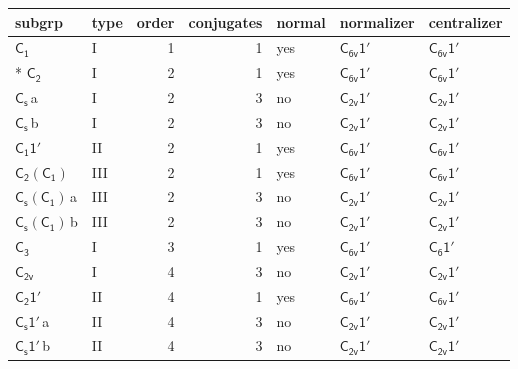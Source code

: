 \documentclass[10pt,a4paper]{article}
\numberwithin{equation}{section}
\newcommand{\grp}[1]{\mathsf{#1}}
\newcommand{\clsletter}[1]{\,{\scriptsize\color{black!55}#1}}
\begin{document}
{\small\begin{longtable}{@{}llrrlll@{}}\toprule
subgrp & type & order & conjugates & normal & normalizer & centralizer\\\midrule\endhead
\bottomrule\endfoot\endlastfoot
\href{../../../rotation/data/pdf/C1.pdf}{$\grp{C_{1}}$} & I & 1 & 1 & yes & \href{C6v-1p.pdf}{$\grp{C_{6v}1'}$} & \href{C6v-1p.pdf}{$\grp{C_{6v}1'}$}\\*
\href{../../../rotation/data/pdf/C2.pdf}{$\grp{C_{2}}$} & I & 2 & 1 & yes & \href{C6v-1p.pdf}{$\grp{C_{6v}1'}$} & \href{C6v-1p.pdf}{$\grp{C_{6v}1'}$}\\
\href{../../../rotation/data/pdf/C1v.pdf}{$\grp{C_{s}}$}\clsletter{a} & I & 2 & 3 & no & \href{C2v-1p.pdf}{$\grp{C_{2v}1'}$} & \href{C2v-1p.pdf}{$\grp{C_{2v}1'}$}\\
\href{../../../rotation/data/pdf/C1v.pdf}{$\grp{C_{s}}$}\clsletter{b} & I & 2 & 3 & no & \href{C2v-1p.pdf}{$\grp{C_{2v}1'}$} & \href{C2v-1p.pdf}{$\grp{C_{2v}1'}$}\\
\href{C1-1p.pdf}{$\grp{C_{1}1'}$} & II & 2 & 1 & yes & \href{C6v-1p.pdf}{$\grp{C_{6v}1'}$} & \href{C6v-1p.pdf}{$\grp{C_{6v}1'}$}\\
\href{C2-C1.pdf}{$\grp{C_{2}}(\grp{C_{1}})$} & III & 2 & 1 & yes & \href{C6v-1p.pdf}{$\grp{C_{6v}1'}$} & \href{C6v-1p.pdf}{$\grp{C_{6v}1'}$}\\
\href{C1v-C1.pdf}{$\grp{C_{s}}(\grp{C_{1}})$}\clsletter{a} & III & 2 & 3 & no & \href{C2v-1p.pdf}{$\grp{C_{2v}1'}$} & \href{C2v-1p.pdf}{$\grp{C_{2v}1'}$}\\
\href{C1v-C1.pdf}{$\grp{C_{s}}(\grp{C_{1}})$}\clsletter{b} & III & 2 & 3 & no & \href{C2v-1p.pdf}{$\grp{C_{2v}1'}$} & \href{C2v-1p.pdf}{$\grp{C_{2v}1'}$}\\
\href{../../../rotation/data/pdf/C3.pdf}{$\grp{C_{3}}$} & I & 3 & 1 & yes & \href{C6v-1p.pdf}{$\grp{C_{6v}1'}$} & \href{C6-1p.pdf}{$\grp{C_{6}1'}$}\\
\href{../../../rotation/data/pdf/C2v.pdf}{$\grp{C_{2v}}$} & I & 4 & 3 & no & \href{C2v-1p.pdf}{$\grp{C_{2v}1'}$} & \href{C2v-1p.pdf}{$\grp{C_{2v}1'}$}\\
\href{C2-1p.pdf}{$\grp{C_{2}1'}$} & II & 4 & 1 & yes & \href{C6v-1p.pdf}{$\grp{C_{6v}1'}$} & \href{C6v-1p.pdf}{$\grp{C_{6v}1'}$}\\
\href{C1v-1p.pdf}{$\grp{C_{s}1'}$}\clsletter{a} & II & 4 & 3 & no & \href{C2v-1p.pdf}{$\grp{C_{2v}1'}$} & \href{C2v-1p.pdf}{$\grp{C_{2v}1'}$}\\
\href{C1v-1p.pdf}{$\grp{C_{s}1'}$}\clsletter{b} & II & 4 & 3 & no & \href{C2v-1p.pdf}{$\grp{C_{2v}1'}$} & \href{C2v-1p.pdf}{$\grp{C_{2v}1'}$}\\

\end{longtable}}
\end{document}
